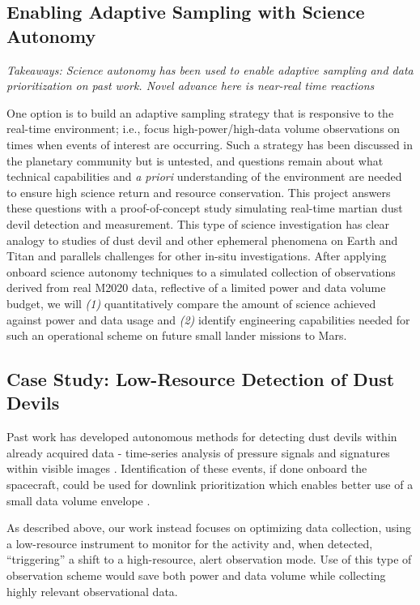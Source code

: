 \subsection{Enabling Adaptive Sampling with Science Autonomy}
\textit{Takeaways: Science autonomy has been used to enable adaptive sampling and data prioritization on past work. Novel advance here is near-real time reactions}

One option is to build an adaptive sampling strategy that is responsive to the real-time environment; i.e., focus high-power/high-data volume observations on times when events of interest are occurring. Such a strategy has been discussed in the planetary community \citep[e.g.,][]{wagstaff_ntrs_2009,Diniega2022,Jackson2023} but is untested, and questions remain about what technical capabilities and \textit{a priori} understanding of the environment are needed to ensure high science return and resource conservation. 
This project answers these questions with a proof-of-concept study simulating real-time martian dust devil detection and measurement. 
This type of science investigation has clear analogy to studies of dust devil and other ephemeral phenomena on Earth \citep[e.g.,][]{Jackson2015} and Titan \citep{Lorenz2021} and parallels challenges for other in-situ investigations. After applying onboard science autonomy techniques to a simulated collection of observations derived from real M2020 data, reflective of a limited power and data volume budget, we will \emph{(1)} quantitatively compare the amount of science achieved against power and data usage and \emph{(2)} identify engineering capabilities needed for such an operational scheme on future small lander missions to Mars.

\subsection{Case Study: Low-Resource Detection of Dust Devils}
Past work has developed autonomous methods for detecting dust devils within already acquired data - time-series analysis of pressure signals and signatures within visible images \citep[e.g.][]{Castano2008,Guzewich2023}. 
Identification of these events, if done onboard the spacecraft, could be used for downlink prioritization which enables better use of a small data volume envelope \citep{wagstaff_ntrs_2009}. 

As described above, our work instead focuses on optimizing data collection, using a low-resource instrument to monitor for the activity and, when detected, ``triggering'' a shift to a high-resource, alert observation mode. 
Use of this type of observation scheme would save both power and data volume while collecting highly relevant observational data.

